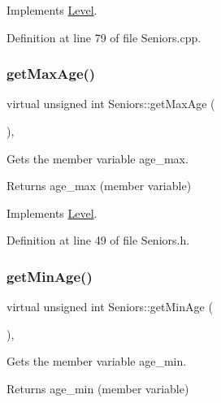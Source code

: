 Implements \hyperlink{class_level_ac118b390f16a75b9a0e9df198b3190ad}{Level}.



Definition at line 79 of file Seniors.\+cpp.

\hypertarget{class_seniors_a856a5d37a9dbda1e1b3ad8eb90db1f2a}{}\label{class_seniors_a856a5d37a9dbda1e1b3ad8eb90db1f2a} 
\subsubsection{\texorpdfstring{get\+Max\+Age()}{getMaxAge()}}
{\footnotesize\ttfamily virtual unsigned int Seniors\+::get\+Max\+Age (\begin{DoxyParamCaption}{ }\end{DoxyParamCaption})\hspace{0.3cm}{\ttfamily [inline]}, {\ttfamily [virtual]}}



Gets the member variable age\+\_\+max. 

\begin{DoxyReturn}{Returns}
age\+\_\+max (member variable) 
\end{DoxyReturn}


Implements \hyperlink{class_level_ae7b28ba0cb8d49372c4657fbe42706e1}{Level}.



Definition at line 49 of file Seniors.\+h.

\hypertarget{class_seniors_a1843edaf8811f4728f76c11c79fe5450}{}\label{class_seniors_a1843edaf8811f4728f76c11c79fe5450} 
\subsubsection{\texorpdfstring{get\+Min\+Age()}{getMinAge()}}
{\footnotesize\ttfamily virtual unsigned int Seniors\+::get\+Min\+Age (\begin{DoxyParamCaption}{ }\end{DoxyParamCaption})\hspace{0.3cm}{\ttfamily [inline]}, {\ttfamily [virtual]}}



Gets the member variable age\+\_\+min. 

\begin{DoxyReturn}{Returns}
age\+\_\+min (member variable) 
\end{DoxyReturn}


